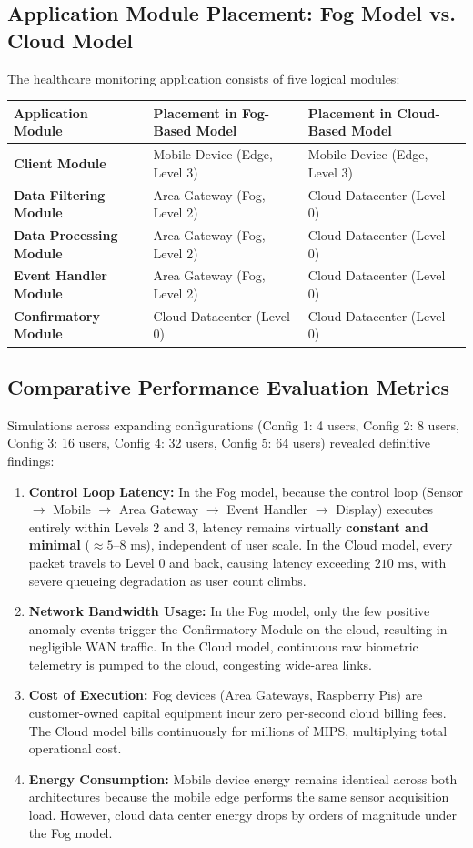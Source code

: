 \documentclass[11pt,a4paper,openany]{report}
\begin{document}
\subsection{Application Module Placement: Fog Model vs. Cloud Model}
The healthcare monitoring application consists of five logical modules:
\begin{center}
\begin{tabularx}{\textwidth}{>{\bfseries}l X X}
\toprule
Application Module & Placement in Fog-Based Model & Placement in Cloud-Based Model\\
\midrule
Client Module & Mobile Device (Edge, Level 3) & Mobile Device (Edge, Level 3)\\
Data Filtering Module & Area Gateway (Fog, Level 2) & Cloud Datacenter (Level 0)\\
Data Processing Module & Area Gateway (Fog, Level 2) & Cloud Datacenter (Level 0)\\
Event Handler Module & Area Gateway (Fog, Level 2) & Cloud Datacenter (Level 0)\\
Confirmatory Module & Cloud Datacenter (Level 0) & Cloud Datacenter (Level 0)\\
\bottomrule
\end{tabularx}
\end{center}

\subsection{Comparative Performance Evaluation Metrics}
Simulations across expanding configurations (Config 1: 4 users, Config 2: 8 users, Config 3: 16 users, Config 4: 32 users, Config 5: 64 users) revealed definitive findings:
\begin{enumerate}[leftmargin=*]
  \item \textbf{Control Loop Latency:} In the Fog model, because the control loop (Sensor $\to$ Mobile $\to$ Area Gateway $\to$ Event Handler $\to$ Display) executes entirely within Levels 2 and 3, latency remains virtually \textbf{constant and minimal} ($\approx 5\text{--}8\text{ ms}$), independent of user scale. In the Cloud model, every packet travels to Level 0 and back, causing latency exceeding $210\text{ ms}$, with severe queueing degradation as user count climbs.
  \item \textbf{Network Bandwidth Usage:} In the Fog model, only the few positive anomaly events trigger the Confirmatory Module on the cloud, resulting in negligible WAN traffic. In the Cloud model, continuous raw biometric telemetry is pumped to the cloud, congesting wide-area links.
  \item \textbf{Cost of Execution:} Fog devices (Area Gateways, Raspberry Pis) are customer-owned capital equipment incur zero per-second cloud billing fees. The Cloud model bills continuously for millions of MIPS, multiplying total operational cost.
  \item \textbf{Energy Consumption:} Mobile device energy remains identical across both architectures because the mobile edge performs the same sensor acquisition load. However, cloud data center energy drops by orders of magnitude under the Fog model.
\end{enumerate}
\end{document}
